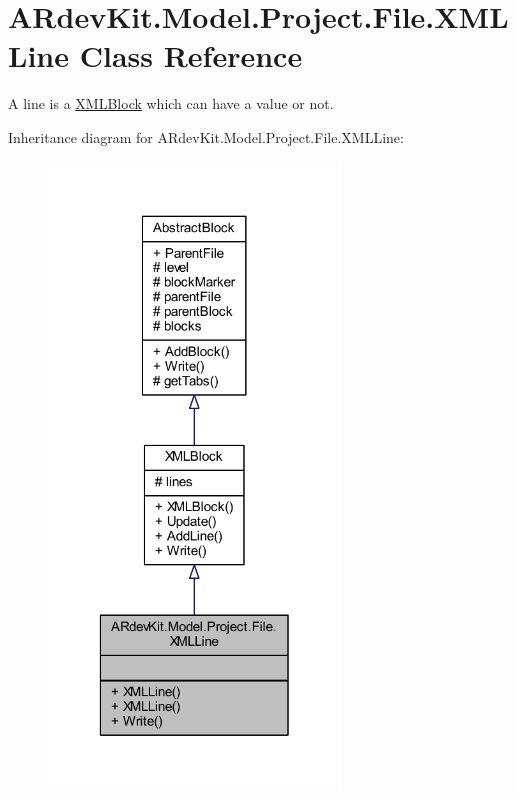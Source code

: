 \hypertarget{class_a_rdev_kit_1_1_model_1_1_project_1_1_file_1_1_x_m_l_line}{\section{A\-Rdev\-Kit.\-Model.\-Project.\-File.\-X\-M\-L\-Line Class Reference}
\label{class_a_rdev_kit_1_1_model_1_1_project_1_1_file_1_1_x_m_l_line}
}


A line is a \hyperlink{class_a_rdev_kit_1_1_model_1_1_project_1_1_file_1_1_x_m_l_block}{X\-M\-L\-Block} which can have a value or not.  




Inheritance diagram for A\-Rdev\-Kit.\-Model.\-Project.\-File.\-X\-M\-L\-Line\-:
\nopagebreak
\begin{figure}[H]
\begin{center}
\leavevmode
\includegraphics[width=220pt]{class_a_rdev_kit_1_1_model_1_1_project_1_1_file_1_1_x_m_l_line__inherit__graph}
\end{center}
\end{figure}


